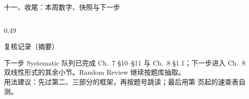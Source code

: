 \documentclass[aspectratio=169,10pt,fontset=none]{ctexbeamer}
\begin{document}
\begin{frame}[t]{十一、收尾：本周数字、快照与下一步}
\begin{columns}[T,onlytextwidth]
\begin{column}{0.49\textwidth}
\begin{block}{\footnotesize 复核记录（摘要）}
\begin{itemize}
        \end{itemize}
      \end{block}
      \begin{exampleblock}{\footnotesize 下一步}
        \scriptsize
        Systematic 队列已完成 Ch.~7 \S10--\S11 与 Ch.~8 \S1.1；下一步进入 Ch.~8 双线性形式的其余小节。Random Review 继续按题库抽取。\\
        用法建议：先过第二、三部分的框架，再按题号跳读；最后用第 \pageref{sec:answers} 页起的速查表自测。
      \end{exampleblock}
    \end{column}
  \end{columns}
\end{frame}
\end{document}
